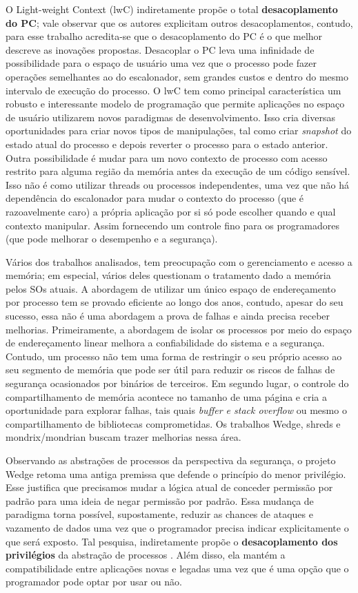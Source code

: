 O Light-weight Context (lwC) indiretamente propõe o total
\textbf{desacoplamento do PC}; vale observar que os autores explicitam outros
desacoplamentos, contudo, para esse trabalho acredita-se que o desacoplamento
do PC é o que melhor descreve as inovações propostas. Desacoplar o PC leva uma
infinidade de possibilidade para o espaço de usuário uma vez que o processo
pode fazer operações semelhantes ao do escalonador, sem grandes custos e dentro
do mesmo intervalo de execução do processo. O lwC tem como principal
característica um robusto e interessante modelo de programação que permite
aplicações no espaço de usuário utilizarem novos paradigmas de desenvolvimento.
Isso cria diversas oportunidades para criar novos tipos de manipulações, tal
como criar \emph{snapshot} do estado atual do processo e depois reverter o
processo para o estado anterior. Outra possibilidade é mudar para um novo
contexto de processo com acesso restrito para alguma região da memória antes da
execução de um código sensível. Isso não é como utilizar threads ou processos
independentes, uma vez que não há dependência do escalonador para mudar o
contexto do processo (que é razoavelmente caro) a própria aplicação por si
só pode escolher quando e qual contexto manipular. Assim fornecendo um
controle fino para os programadores (que pode melhorar o desempenho e a
segurança).

Vários dos trabalhos analisados, tem preocupação com o gerenciamento e acesso a
memória; em especial, vários deles questionam o tratamento dado a memória pelos
SOs atuais.  A abordagem de utilizar um único espaço de endereçamento por
processo tem se provado eficiente ao longo dos anos, contudo, apesar do seu
sucesso, essa não é uma abordagem a prova de falhas e ainda precisa receber
melhorias.  Primeiramente, a abordagem de isolar os processos por meio do
espaço de endereçamento linear melhora a confiabilidade do sistema e a
segurança.  Contudo, um processo não tem uma forma de restringir o seu próprio
acesso ao seu segmento de memória que pode ser útil para reduzir os riscos de
falhas de segurança ocasionados por binários de terceiros. Em segundo lugar, o
controle do compartilhamento de memória acontece no tamanho de uma página e
cria a oportunidade para explorar falhas, tais quais \emph{buffer e stack
overflow} ou mesmo o compartilhamento de bibliotecas comprometidas. Os
trabalhos Wedge, shreds e mondrix/mondrian buscam trazer melhorias nessa área.

Observando as abstrações de processos da perspectiva da segurança, o projeto
Wedge retoma uma antiga premissa que defende o princípio do menor privilégio.
Esse justifica que precisamos mudar a lógica atual de conceder permissão por
padrão para uma ideia de negar permissão por padrão. Essa mudança de paradigma
torna possível, supostamente, reduzir as chances de ataques e vazamento de
dados uma vez que o programador precisa indicar explicitamente o que será
exposto. Tal pesquisa, indiretamente propõe o \textbf{desacoplamento dos
privilégios} da abstração de processos . Além disso, ela mantém a
compatibilidade entre aplicações novas e legadas uma vez que é uma opção que o
programador pode optar por usar ou não.


